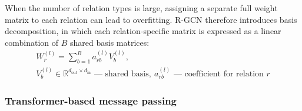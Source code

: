 When the number of relation types is large, assigning a separate full weight
matrix to each relation can lead to overfitting.
R-GCN therefore introduces basis decomposition, in which each
relation-specific matrix is expressed as a linear combination of $B$ shared
basis matrices:
\begin{equation}
\label{eq:rgcn-basis}
\begin{gathered}
W_r^{(l)} =
\sum_{b=1}^{B} a_{rb}^{(l)} V_b^{(l)}, \\[0.4em]
{\scriptstyle
V_b^{(l)}\in\mathbb{R}^{d_{\mathrm{out}}\times d_{\mathrm{in}}}\text{ --- shared basis},\ 
a_{rb}^{(l)}\text{ --- coefficient for relation }r
}
\end{gathered}
\end{equation}

\subsubsection{Transformer-based message passing}

